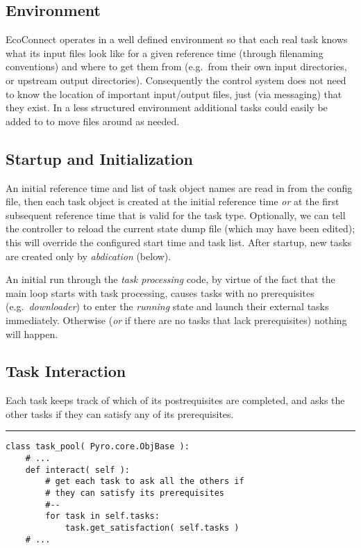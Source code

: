 \subsection{Environment}

EcoConnect operates in a well defined environment so that each real task
knows what its input files look like for a given reference time
(through filenaming conventions) and where to get them from (e.g.\ from
their own input directories, or upstream output directories).
Consequently the control system does not need to know the location of
important input/output files, just (via messaging) that they exist. In a
less structured environment additional tasks could easily be added to
to move files around as needed. 

\subsection{Startup and Initialization}

An initial reference time and list of task object names are read in from
the config file, then each task object is created at the initial
reference time {\em or} at the first subsequent reference time that is
valid for the task type. Optionally, we can tell the controller to
reload the current state dump file (which may have been edited); this
will override the configured start time and task list. After startup,
new tasks are created only by {\em abdication} (below).

An initial run through the {\em task processing} code, by virtue of the
fact that the main loop starts with task processing, causes tasks with
no prerequisites (e.g.\ {\em downloader}) to enter the {\em running}
state and launch their external tasks immediately. Otherwise ({\em or}
if there are no tasks that lack prerequisites) nothing will happen.


\subsection{Task Interaction} 

Each task keeps track of which of its postrequisites are completed, and
asks the other tasks if they can satisfy any of its prerequisites. 

{\small
\noindent
\rule{5cm}{.2mm}
\begin{lstlisting}
class task_pool( Pyro.core.ObjBase ):
    # ...
    def interact( self ):
        # get each task to ask all the others if 
        # they can satisfy its prerequisites
        #--
        for task in self.tasks:
            task.get_satisfaction( self.tasks )
    # ...
\end{lstlisting}
}

